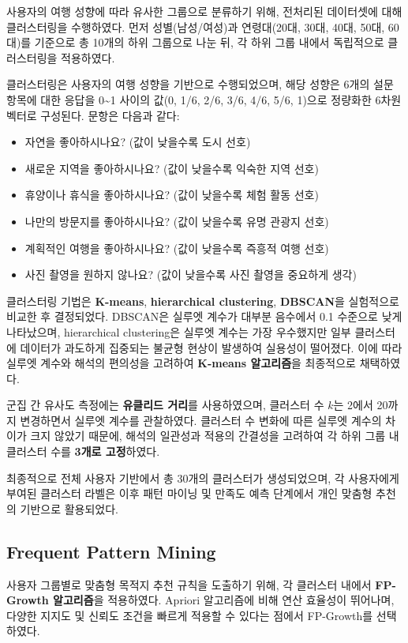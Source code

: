 \documentclass[sigconf]{acmart}
\begin{document}
\begin{CJK}{UTF8}{mj}
사용자의 여행 성향에 따라 유사한 그룹으로 분류하기 위해, 전처리된 데이터셋에 대해 클러스터링을 수행하였다. 먼저 성별(남성/여성)과 연령대(20대, 30대, 40대, 50대, 60대)를 기준으로 총 10개의 하위 그룹으로 나눈 뒤, 각 하위 그룹 내에서 독립적으로 클러스터링을 적용하였다.

클러스터링은 사용자의 여행 성향을 기반으로 수행되었으며, 해당 성향은 6개의 설문 항목에 대한 응답을 0\textasciitilde{}1 사이의 값(0, 1/6, 2/6, 3/6, 4/6, 5/6, 1)으로 정량화한 6차원 벡터로 구성된다. 문항은 다음과 같다:
\begin{itemize}
  \item 자연을 좋아하시나요? (값이 낮을수록 도시 선호)
  \item 새로운 지역을 좋아하시나요? (값이 낮을수록 익숙한 지역 선호)
  \item 휴양이나 휴식을 좋아하시나요? (값이 낮을수록 체험 활동 선호)
  \item 나만의 방문지를 좋아하시나요? (값이 낮을수록 유명 관광지 선호)
  \item 계획적인 여행을 좋아하시나요? (값이 낮을수록 즉흥적 여행 선호)
  \item 사진 촬영을 원하지 않나요? (값이 낮을수록 사진 촬영을 중요하게 생각)
\end{itemize}

클러스터링 기법은 \textbf{K-means}, \textbf{hierarchical clustering}, \textbf{DBSCAN}을 실험적으로 비교한 후 결정되었다. DBSCAN은 실루엣 계수가 대부분 음수에서 0.1 수준으로 낮게 나타났으며, hierarchical clustering은 실루엣 계수는 가장 우수했지만 일부 클러스터에 데이터가 과도하게 집중되는 불균형 현상이 발생하여 실용성이 떨어졌다. 이에 따라 실루엣 계수와 해석의 편의성을 고려하여 \textbf{K-means 알고리즘}을 최종적으로 채택하였다.

군집 간 유사도 측정에는 \textbf{유클리드 거리}를 사용하였으며, 클러스터 수 $k$는 2에서 20까지 변경하면서 실루엣 계수를 관찰하였다. 클러스터 수 변화에 따른 실루엣 계수의 차이가 크지 않았기 때문에, 해석의 일관성과 적용의 간결성을 고려하여 각 하위 그룹 내 클러스터 수를 \textbf{3개로 고정}하였다.

최종적으로 전체 사용자 기반에서 총 30개의 클러스터가 생성되었으며, 각 사용자에게 부여된 클러스터 라벨은 이후 패턴 마이닝 및 만족도 예측 단계에서 개인 맞춤형 추천의 기반으로 활용되었다.


\subsection{Frequent Pattern Mining}

사용자 그룹별로 맞춤형 목적지 추천 규칙을 도출하기 위해, 각 클러스터 내에서 \textbf{FP-Growth 알고리즘}을 적용하였다. Apriori 알고리즘에 비해 연산 효율성이 뛰어나며, 다양한 지지도 및 신뢰도 조건을 빠르게 적용할 수 있다는 점에서 FP-Growth를 선택하였다.


\end{CJK}
\end{document}
